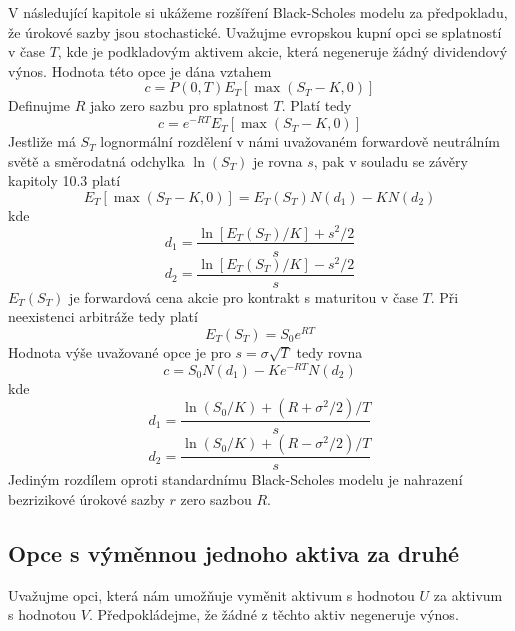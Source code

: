 \documentclass[a4paper]{book}
\begin{document}
V následující kapitole si ukážeme rozšíření Black-Scholes modelu za předpokladu, že úrokové sazby jsou stochastické. Uvažujme evropskou kupní opci se splatností v čase $T$, kde je podkladovým aktivem akcie, která negeneruje žádný dividendový výnos. Hodnota této opce je dána vztahem
\begin{equation*}
c = P(0,T)E_T[\max(S_T - K,0)]
\end{equation*}
Definujme $R$ jako zero sazbu pro splatnost $T$. Platí tedy
\begin{equation*}
c = e^{-RT}E_T[\max(S_T-K,0)]
\end{equation*}
Jestliže má $S_T$ lognormální rozdělení v námi uvažovaném forwardově neutrálním světě a směrodatná odchylka $\ln(S_T)$ je rovna $s$, pak v souladu se závěry kapitoly 10.3 platí
\begin{equation*}
E_T[\max(S_T-K,0)] = E_T(S_T)N(d_1)-KN(d_2)
\end{equation*}
kde
\begin{equation*}
d_1 = \frac{\ln[E_T(S_T)/K]+s^2/2}{s}
\end{equation*}
\begin{equation*}
d_2 = \frac{\ln[E_T(S_T)/K]-s^2/2}{s}
\end{equation*}
$E_T(S_T)$ je forwardová cena akcie pro kontrakt s maturitou v čase $T$. Při neexistenci arbitráže tedy platí
\begin{equation*}
E_T(S_T) = S_0e^{RT}
\end{equation*}
Hodnota výše uvažované opce je pro $s = \sigma \sqrt{T}$ tedy rovna
\begin{equation*}
c = S_0N(d_1)-Ke^{-RT}N(d_2)
\end{equation*}
kde
\begin{equation*}
d_1 = \frac{\ln(S_0/K)+(R+\sigma^2/2)/T}{s}
\end{equation*}
\begin{equation*}
d_2 = \frac{\ln(S_0/K)+(R-\sigma^2/2)/T}{s}
\end{equation*}
Jediným rozdílem oproti standardnímu Black-Scholes modelu je nahrazení bezrizikové úrokové sazby $r$ zero sazbou $R$.

\subsection{Opce s výměnnou jednoho aktiva za druhé}

Uvažujme opci, která nám umožňuje vyměnit aktivum s hodnotou $U$ za aktivum s hodnotou $V$. Předpokládejme, že žádné z těchto aktiv negeneruje výnos.
\end{document}
